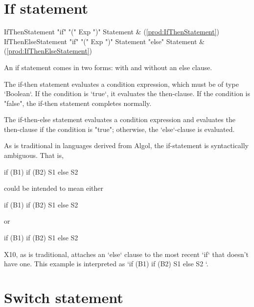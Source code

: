 \section{If statement}

\begin{bbgrammar}
     IfThenStatement \: \xcd"if" \xcd"(" Exp \xcd")" Statement & (\ref{prod:IfThenStatement}) \\
 IfThenElseStatement \: \xcd"if" \xcd"(" Exp \xcd")" Statement  \xcd"else" Statement  & (\ref{prod:IfThenElseStatement}) \\
\end{bbgrammar}

An if statement comes in two forms: with and without an else
clause.

The if-then statement evaluates a condition expression, which must be of type
\xcd`Boolean`. If the condition is \xcd`true`, it evaluates the then-clause.
If the condition is \xcd"false", the if-then statement completes normally.

The if-then-else statement evaluates a condition expression and 
evaluates the then-clause if the condition is
\xcd"true"; otherwise, the \xcd`else`-clause is evaluated.

As is traditional in languages derived from Algol, the if-statement is syntactically
ambiguous.  That is, 
\begin{xten}
if (B1) if (B2) S1 else S2
\end{xten}
could be intended to mean either 
\begin{xten}
if (B1) { if (B2) S1 else S2 }
\end{xten} 
or 
\begin{xten}
if (B1) {if (B2) S1} else S2
\end{xten}
X10, as is traditional, attaches an \xcd`else` clause to the most recent
\xcd`if` that doesn't have one.
This example is interpreted as 
\xcd`if (B1) { if (B2) S1 else S2 }`. 



\section{Switch statement}


